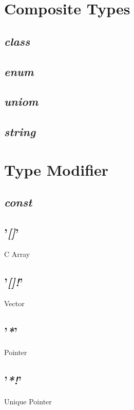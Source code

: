 \documentclass[11pt,a4paper]{article}
\begin{document}
\section{Composite Types}


\subsection{\textit{class}}


\subsection{\textit{enum}}


\subsection{\textit{uniom}}


\subsection{\textit{string}}





\section{Type Modifier}


\subsection{\textit{const}}


\subsection{'\textit{[]}'}
C Array


\subsection{'\textit{[]!}'}
Vector


\subsection{'\textit{*}'}
Pointer


\subsection{'\textit{*!}'}
Unique Pointer
\end{document}
